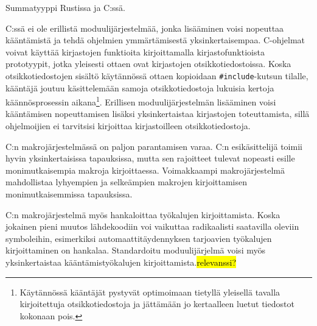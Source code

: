 \begin{listing}[ht!]
    \inputminted{Rust}{koodi/rustenum.rs}
    \inputminted[firstline=3]{C}{koodi/csumtype.c}
    \caption{Summatyyppi Rustissa ja C:ssä.}
    \label{fig:csumtype}
\end{listing}


C:ssä ei ole erillistä moduulijärjestelmää, jonka lisääminen voisi nopeuttaa
kääntämistä ja tehdä ohjelmien ymmärtämisestä yksinkertaisempaa. C-ohjelmat
voivat käyttää kirjastojen funktioita kirjoittamalla kirjastofunktioista
prototyypit, jotka yleisesti ottaen ovat kirjastojen otsikkotiedostoissa. Koska
otsikkotiedostojen sisältö käytännössä ottaen kopioidaan
\texttt{\#include}-kutsun tilalle, kääntäjä joutuu käsittelemään samoja
otsikkotiedostoja lukuisia kertoja käännösprosessin aikana\footnote{Käytännössä
kääntäjät pystyvät optimoimaan tietyllä yleisellä tavalla kirjoitettuja
otsikkotiedostoja ja jättämään jo kertaalleen luetut tiedostot kokonaan pois.}.
Erillisen moduulijärjestelmän lisääminen voisi kääntämisen nopeuttamisen
lisäksi yksinkertaistaa kirjastojen toteuttamista, sillä ohjelmoijien ei
tarvitsisi kirjoittaa kirjastoilleen otsikkotiedostoja. 

C:n makrojärjestelmässä on paljon parantamisen varaa. C:n esikäsittelijä toimii
hyvin yksinkertaisissa tapauksissa, mutta sen rajoitteet tulevat nopeasti
esille monimutkaisempia makroja kirjoittaessa. Voimakkaampi makrojärjestelmä
mahdollistaa lyhyempien ja selkeämpien makrojen kirjoittamisen
monimutkaisemmissa tapauksissa.


C:n makrojärjestelmä myös hankaloittaa työkalujen kirjoittamista. Koska
jokainen pieni muutos lähdekoodiin voi vaikuttaa radikaalisti saatavilla
oleviin symboleihin, esimerkiksi automaattitäydennyksen tarjoavien työkalujen
kirjoittaminen on hankalaa. Standardoitu moduulijärjelmä voisi myös
yksinkertaistaa kääntämistyökalujen kirjoittamista.\hl{relevanssi?}
